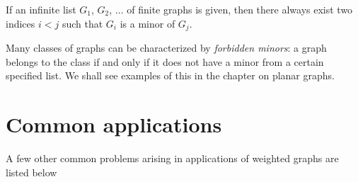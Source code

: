 \begin{theorem}
{\rm
If an infinite list $G_1$, $G_2$, $\dots$ of finite graphs is given, then there always exist two indices
$i < j$ such that $G_i$ is a minor of $G_j$.
}
\end{theorem}

Many classes of graphs can be characterized by {\it forbidden minors}: a
graph belongs to the class if and only if it does not have a minor
from a certain specified list.
We shall see examples of this in the chapter on planar graphs.


\section{Common applications}

A few other common problems arising in applications of weighted graphs
are listed below

